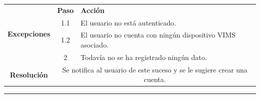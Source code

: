 \begin{table}[H]
\begin{tabularx}{\textwidth}{|c|c|X|}
    \hline
    \multirow{4}{*}{\textbf{Excepciones}}      & \textbf{Paso}                                                                                                                                                         & \textbf{Acción}                                                                                                                                 \\
    \cline{2-3}
                                               & 1.1                                                                                                                                                                   & \multicolumn{1}{L|}{El usuario no está autenticado.}                                                                                            \\
    \cline{2-3}
                                               & 1.2                                                                                                                                                                   & \multicolumn{1}{L|}{El usuario no cuenta con ningún dispositivo \ac{VIMS} asociado.}                                                            \\
    \cline{2-3}
                                               & 2                                                                                                                                                                     & \multicolumn{1}{L|}{Todavía no se ha registrado ningún dato.}                                                                                   \\
    \hline\hline
    \textbf{Resolución}                        & \multicolumn{2}{X|}{Se notifica al usuario de este suceso y se le sugiere crear una cuenta.}                                                                                                                                                                                                                            \\
    \hline
  \end{tabularx}
\end{table}

\noindent\rule{\linewidth}{.2pt}


